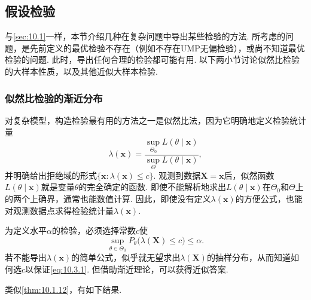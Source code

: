 \subsection{假设检验}\label{sec:10.3}
与\autoref{sec:10.1}一样，本节介绍几种在复杂问题中导出某些检验的方法. 所考虑的问题，是先前定义的最优检验不存在（例如不存在UMP无偏检验），或尚不知道最优检验的问题. 此时，导出任何合理的检验都可能有用. 以下两小节讨论似然比检验的大样本性质，以及其他近似大样本检验.

\subsubsection{似然比检验的渐近分布}\label{sec:10.3.1}
对复杂模型，构造检验最有用的方法之一是似然比法，因为它明确地定义检验统计量
$$\lambda(\boldsymbol x)=\frac{\sup_{\Theta_0}L(\theta\mid\boldsymbol x)}{\sup_\Theta L(\theta\mid\boldsymbol x)},$$
并明确给出拒绝域的形式$\{\boldsymbol x:\lambda(\boldsymbol x)\leq c\}$. 观测到数据$\boldsymbol X=\boldsymbol x$后，似然函数$L(\theta\mid\boldsymbol x)$就是变量$\theta$的完全确定的函数.
即使不能解析地求出$L(\theta\mid\boldsymbol x)$在$\Theta_0$和$\Theta$上的两个上确界，通常也能数值计算. 因此，即使没有定义$\lambda(\boldsymbol x)$的方便公式，也能对观测数据点求得检验统计量$\lambda(\boldsymbol x)$.

为定义水平$\alpha$的检验，必须选择常数$c$使
\begin{equation}\label{eq:10.3.1}
\sup_{\theta\in\Theta_0}P_\theta\bigl(\lambda(\boldsymbol X)\leq c\bigr)\leq\alpha.
\end{equation}
若不能导出$\lambda(\boldsymbol x)$的简单公式，似乎就无望求出$\lambda(\boldsymbol X)$的抽样分布，从而知道如何选$c$以保证\eqref{eq:10.3.1}. 但借助渐近理论，可以获得近似答案.

类似\autoref{thm:10.1.12}，有如下结果.

